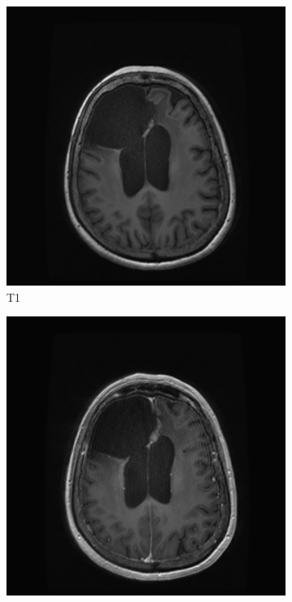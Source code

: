 \begin{figure}
\centering

\newlength{\figexamplewidth}
\setlength{\figexamplewidth}{0.22\textwidth}

\begin{subfigure}[t]{\figexamplewidth}
    \centering
    \includegraphics[trim={0.5cm 0cm 0.5cm 1cm}, clip, width=\textwidth]{Figures/T1}
    \caption{\gls{T1}}\label{fig:T1}
\end{subfigure}
\begin{subfigure}[t]{\figexamplewidth}
    \centering
    \includegraphics[trim={0.5cm 0cm 0.5cm 1cm}, clip, width=\textwidth]{Figures/T1GD}

\end{subfigure}
\end{figure}
